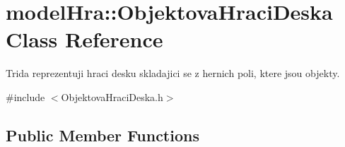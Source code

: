 \hypertarget{classmodel_hra_1_1_objektova_hraci_deska}{\section{model\-Hra\-:\-:Objektova\-Hraci\-Deska Class Reference}
\label{classmodel_hra_1_1_objektova_hraci_deska}
}


Trida reprezentuji hraci desku skladajici se z hernich poli, ktere jsou objekty.  




{\ttfamily \#include $<$Objektova\-Hraci\-Deska.\-h$>$}

\subsection*{Public Member Functions}
